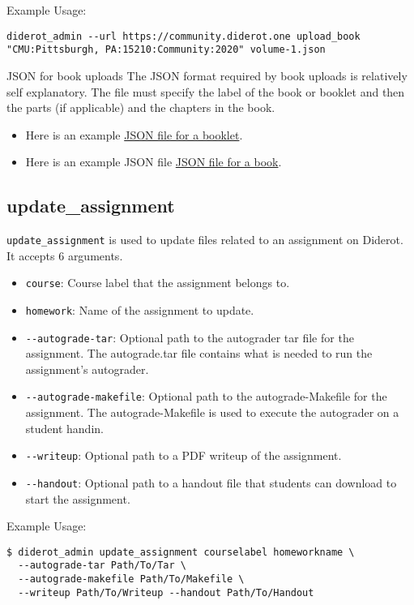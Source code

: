 Example Usage:
\begin{verbatim}
diderot_admin --url https://community.diderot.one upload_book  "CMU:Pittsburgh, PA:15210:Community:2020" volume-1.json
\end{verbatim}
 
\begin{gram}{JSON  for book uploads}
The JSON format required by book uploads is relatively self explanatory.
The file must specify the label of the book or booklet and then the parts (if applicable) and the chapters in the book. 
%
\begin{itemize}
\item Here is an example 
\href{file://cli/attachments/booklet-example.json}
{JSON file for a booklet}.
\item Here is an example JSON file 
\href{file://cli/attachment/book-example.json}
{JSON file for a book}.
\end{itemize}
\end{gram}



\subsection{update\_assignment}

\verb|update_assignment| is used to update files related to an assignment on Diderot.
%
It accepts 6 arguments.

\begin{itemize}
  \item \verb|course|: Course label that the assignment belongs to.
  \item \verb|homework|: Name of the assignment to update.
  \item \verb|--autograde-tar|: Optional path to the autograder tar file for the assignment. The autograde.tar file contains what is needed to run the assignment's autograder.
  \item \verb|--autograde-makefile|: Optional path to the autograde-Makefile for the assignment. The autograde-Makefile is used to execute the autograder on a student handin.
  \item \verb|--writeup|: Optional path to a PDF writeup of the assignment.
  \item \verb|--handout|: Optional path to a handout file that students can download to start the assignment.
\end{itemize}

Example Usage:
\begin{verbatim}
$ diderot_admin update_assignment courselabel homeworkname \
  --autograde-tar Path/To/Tar \
  --autograde-makefile Path/To/Makefile \
  --writeup Path/To/Writeup --handout Path/To/Handout
\end{verbatim}
